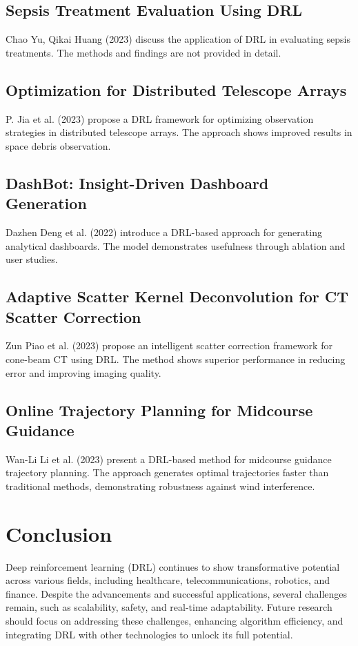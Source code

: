 \documentclass{article}
\begin{document}
\subsection{Sepsis Treatment Evaluation Using DRL}
Chao Yu, Qikai Huang (2023) discuss the application of DRL in evaluating sepsis treatments. The methods and findings are not provided in detail.

\subsection{Optimization for Distributed Telescope Arrays}
P. Jia et al. (2023) propose a DRL framework for optimizing observation strategies in distributed telescope arrays. The approach shows improved results in space debris observation.

\subsection{DashBot: Insight-Driven Dashboard Generation}
Dazhen Deng et al. (2022) introduce a DRL-based approach for generating analytical dashboards. The model demonstrates usefulness through ablation and user studies.

\subsection{Adaptive Scatter Kernel Deconvolution for CT Scatter Correction}
Zun Piao et al. (2023) propose an intelligent scatter correction framework for cone-beam CT using DRL. The method shows superior performance in reducing error and improving imaging quality.

\subsection{Online Trajectory Planning for Midcourse Guidance}
Wan-Li Li et al. (2023) present a DRL-based method for midcourse guidance trajectory planning. The approach generates optimal trajectories faster than traditional methods, demonstrating robustness against wind interference.

\section{Conclusion}
Deep reinforcement learning (DRL) continues to show transformative potential across various fields, including healthcare, telecommunications, robotics, and finance. Despite the advancements and successful applications, several challenges remain, such as scalability, safety, and real-time adaptability. Future research should focus on addressing these challenges, enhancing algorithm efficiency, and integrating DRL with other technologies to unlock its full potential.
\end{document}

